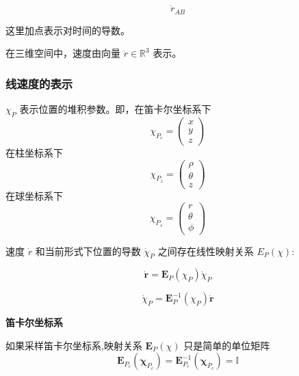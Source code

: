 \documentclass[11pt]{ctexart}
\begin{document}
\begin{equation}
    \dot{r}_{AB}
\end{equation}

这里加点表示对时间的导数。

在三维空间中，速度由向量 $\dot{r}\in \mathbb{R}^3$ 表示。

\subsubsection{线速度的表示}
$\chi_{P}$ 表示位置的堆积参数。即，在笛卡尔坐标系下
$$
\left.\chi_{P_c}=\left(\begin{array}{c}x\\y\\z\end{array}\right.\right)
$$
在柱坐标系下
$$
\left.\chi_{P_z}=\left(\begin{array}{c}\rho\\\theta\\z\end{array}\right.\right)
$$
在球坐标系下
$$
\left.\chi_{P_s}=\left(\begin{array}{c}r\\\theta\\\phi\end{array}\right.\right)
$$

速度 $\dot{r}$ 和当前形式下位置的导数 $\dot{\chi}_P$ 之间存在线性映射关系 $E_P(\chi)$:

\begin{equation}
    \dot{\mathbf{r}}=\mathbf{E}_{P}\left(\chi_{P}\right)\dot{\chi}_{P}
\end{equation}

\begin{equation}
    \dot{\chi}_{P}=\mathbf{E}_{P}^{-1}\left(\chi_{P}\right)\dot{\mathbf{r}}
\end{equation}

\noindent\textbf{笛卡尔坐标系}

如果采样笛卡尔坐标系,映射关系 $\mathbf{E}_{P}(\chi)$ 只是简单的单位矩阵
\begin{equation}
    \mathbf{E}_{P_c}\left(\boldsymbol{\chi}_{P_c}\right)=\mathbf{E}_{P_c}^{-1}\left(\boldsymbol{\chi}_{P_c}\right)=\mathbb{I}
\end{equation}
\end{document}
